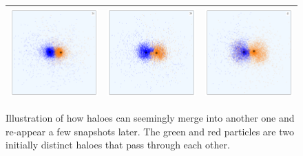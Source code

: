 \begin{figure}[!htbp]
{\begin{tabular}{|p{5.3cm}p{5.3cm}p{5.3cm}|}
            {\includegraphics[width = 5.3cm]{images/jumper-demo/particleplot_00034.png}} 	& 
    		{\includegraphics[width = 5.3cm]{images/jumper-demo/particleplot_00038.png}}	& 
            {\includegraphics[width = 5.3cm]{images/jumper-demo/particleplot_00041.png}} 	\\%
        	\hline
    	\end{tabular}
    }
	\caption{\label{fig:jumper-demo} 
        Illustration of how haloes can seemingly merge into another one and re-appear a few snapshots later.
        The green and red particles are two initially distinct haloes that pass through each other.
}
\end{figure}
